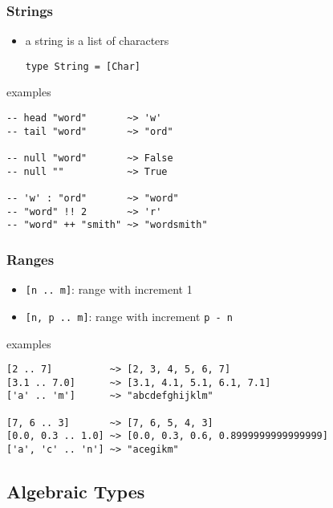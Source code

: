 \documentclass[dvipsnames]{beamer}
\theoremstyle{plain}
\begin{document}
\begin{frame}[fragile]
  \frametitle{Strings}

  \begin{itemize}
   \item a string is a list of characters
    \begin{lstlisting}
type String = [Char]
    \end{lstlisting}
  \end{itemize}

  \begin{exampleblock}{examples}
    \begin{lstlisting}
-- head "word"       ~> 'w'
-- tail "word"       ~> "ord"

-- null "word"       ~> False
-- null ""           ~> True

-- 'w' : "ord"       ~> "word"
-- "word" !! 2       ~> 'r'
-- "word" ++ "smith" ~> "wordsmith" 
    \end{lstlisting}
  \end{exampleblock}
\end{frame}

\begin{frame}[fragile]
  \frametitle{Ranges}

  \begin{itemize}
    \item \lstinline|[n .. m]|: range with increment 1
    \item \lstinline|[n, p .. m]|: range with increment \texttt{p - n}
  \end{itemize}

  \begin{exampleblock}{examples}
    \begin{lstlisting}
[2 .. 7]          ~> [2, 3, 4, 5, 6, 7]
[3.1 .. 7.0]      ~> [3.1, 4.1, 5.1, 6.1, 7.1]
['a' .. 'm']      ~> "abcdefghijklm"

[7, 6 .. 3]       ~> [7, 6, 5, 4, 3]
[0.0, 0.3 .. 1.0] ~> [0.0, 0.3, 0.6, 0.8999999999999999]
['a', 'c' .. 'n'] ~> "acegikm"
    \end{lstlisting}
  \end{exampleblock}
\end{frame}

\subsection{Algebraic Types}
\end{document}
